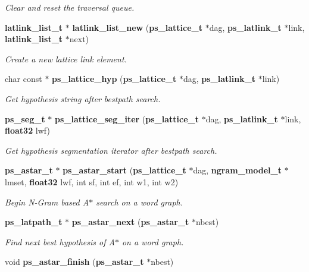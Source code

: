 \begin{DoxyCompactItemize}
\begin{DoxyCompactList}\small\item\em \-Clear and reset the traversal queue. \end{DoxyCompactList}\item 
{\bf latlink\-\_\-list\-\_\-t} $\ast$ {\bf latlink\-\_\-list\-\_\-new} ({\bf ps\-\_\-lattice\-\_\-t} $\ast$dag, {\bf ps\-\_\-latlink\-\_\-t} $\ast$link, {\bf latlink\-\_\-list\-\_\-t} $\ast$next)\label{ps__lattice__internal_8h_a7197508af770064ea825bb812dd6eddc}

\begin{DoxyCompactList}\small\item\em \-Create a new lattice link element. \end{DoxyCompactList}\item 
char const $\ast$ {\bf ps\-\_\-lattice\-\_\-hyp} ({\bf ps\-\_\-lattice\-\_\-t} $\ast$dag, {\bf ps\-\_\-latlink\-\_\-t} $\ast$link)\label{ps__lattice__internal_8h_a02b07c009d23b852bd4db54700dfac5b}

\begin{DoxyCompactList}\small\item\em \-Get hypothesis string after bestpath search. \end{DoxyCompactList}\item 
{\bf ps\-\_\-seg\-\_\-t} $\ast$ {\bf ps\-\_\-lattice\-\_\-seg\-\_\-iter} ({\bf ps\-\_\-lattice\-\_\-t} $\ast$dag, {\bf ps\-\_\-latlink\-\_\-t} $\ast$link, {\bf float32} lwf)\label{ps__lattice__internal_8h_afedbc5558c18f7d029e84a4e27e38187}

\begin{DoxyCompactList}\small\item\em \-Get hypothesis segmentation iterator after bestpath search. \end{DoxyCompactList}\item 
{\bf ps\-\_\-astar\-\_\-t} $\ast$ {\bf ps\-\_\-astar\-\_\-start} ({\bf ps\-\_\-lattice\-\_\-t} $\ast$dag, {\bf ngram\-\_\-model\-\_\-t} $\ast$lmset, {\bf float32} lwf, int sf, int ef, int w1, int w2)
\begin{DoxyCompactList}\small\item\em \-Begin \-N-\/\-Gram based \-A$\ast$ search on a word graph. \end{DoxyCompactList}\item 
{\bf ps\-\_\-latpath\-\_\-t} $\ast$ {\bf ps\-\_\-astar\-\_\-next} ({\bf ps\-\_\-astar\-\_\-t} $\ast$nbest)
\begin{DoxyCompactList}\small\item\em \-Find next best hypothesis of \-A$\ast$ on a word graph. \end{DoxyCompactList}\item 
void {\bf ps\-\_\-astar\-\_\-finish} ({\bf ps\-\_\-astar\-\_\-t} $\ast$nbest)\label{ps__lattice__internal_8h_abfb03e9e0fcbe3def45120f5ba43be14}


\end{DoxyCompactItemize}
